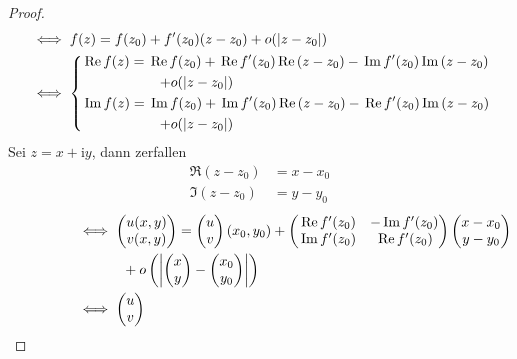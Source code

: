 \documentclass[a4paper,10pt]{scrbook}
\begin{document}
\begin{theorem}[Satz]
  \begin{proof}
    \begin{align*}
      &\iff f(z) = f(z_0) + f'(z_0)(z-z_0) + o(|z-z_0|) \\
      &\iff
      \begin{dcases}
        \Re f(z) = \Re f(z_0) + \Re f'(z_0) \Re (z-z_0) - \Im f'(z_0) \Im (z-z_0) \\ \mspace{100mu} + o(|z-z_0|) \\
        \Im f(z) = \Im f(z_0) + \Im f'(z_0) \Re (z-z_0) - \Re f'(z_0) \Im (z-z_0) \\ \mspace{100mu} + o(|z-z_0|)
      \end{dcases}
    \end{align*}
    Sei $z = x + \mathrm{i} y$, dann zerfallen
    \begin{align*}
      \Re (z-z_0) &= x - x_0 \\
      \Im (z-z_0) &= y - y_0
    \end{align*}
    \begin{align*}
      \phantom{\text{\ref{itm:2.20 i}}} &\iff
      \begin{pmatrix}
        u(x,y) \\ v(x,y)
      \end{pmatrix}
      =
      \begin{pmatrix}
        u \\ v
      \end{pmatrix}
      (x_0,y_0) +
      \begin{pmatrix}
        \Re f'(z_0) & -\Im f'(z_0) \\
        \Im f'(z_0) & \Re f'(z_0)
      \end{pmatrix}
      \begin{pmatrix}
        x-x_0 \\
        y-y_0
      \end{pmatrix}\\
      &\phantom{\iff\quad}
      +
      o
      \left(\left|
      \begin{pmatrix}
        x \\ y
      \end{pmatrix}
      -
      \begin{pmatrix}
        x_0 \\ y_0
      \end{pmatrix}
      \right|\right) \\
      &\iff
      \begin{pmatrix}
        u \\ v

\end{pmatrix}
\end{align*}
\end{proof}
\end{theorem}
\end{document}
